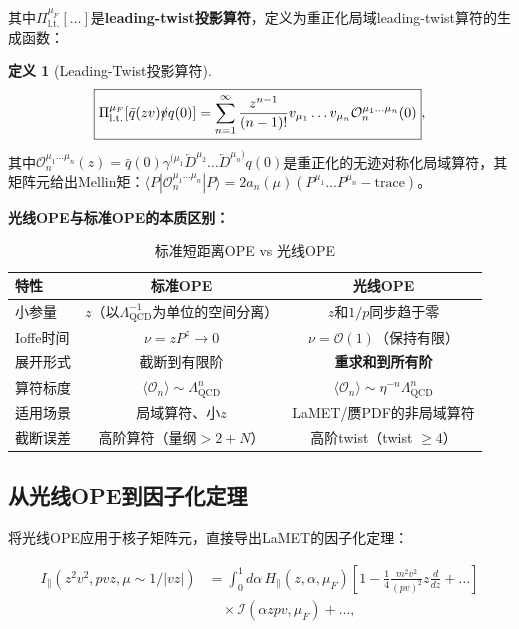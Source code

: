 \documentclass[12pt,a4paper]{ctexart}
\theoremstyle{definition}
\newtheorem{definition}{定义}[section]
\begin{document}
其中$\Pi^{\mu_F}_{\text{l.t.}}[\ldots]$是\textbf{leading-twist投影算符}，定义为重正化局域leading-twist算符的生成函数：

\begin{definition}[Leading-Twist投影算符]\cite{Braun2019power}
\begin{equation}
\boxed{\Pi^{\mu_F}_{\text{l.t.}}[\bar{q}(zv)\slashed{v}q(0)] = \sum_{n=1}^{\infty} \frac{z^{n-1}}{(n-1)!} v_{\mu_1}\ldots v_{\mu_n} \mathcal{O}_n^{\mu_1\ldots\mu_n}(0)},
\label{eq:leading_twist_projection}
\end{equation}
其中$\mathcal{O}_n^{\mu_1\ldots\mu_n}(z) = \bar{q}(0)\gamma^{(\mu_1}\overleftarrow{D}^{\mu_2}\ldots\overleftarrow{D}^{\mu_n)}q(0)$是重正化的无迹对称化局域算符，其矩阵元给出Mellin矩：$\langle P|\mathcal{O}_n^{\mu_1\ldots\mu_n}|P\rangle = 2a_n(\mu)(P^{\mu_1}\ldots P^{\mu_n} - \text{trace})$。
\end{definition}

\textbf{光线OPE与标准OPE的本质区别：}

\begin{table}[H]
\centering
\caption{标准短距离OPE vs 光线OPE}
\label{tab:OPE_comparison}
\begin{tabular}{lcc}
\toprule
特性 & 标准OPE & 光线OPE \\
\midrule
小参量     & $z$（以$\Lambda_{\text{QCD}}^{-1}$为单位的空间分离） & $z$和$1/p$同步趋于零 \\
Ioffe时间  & $\nu = zP^z \to 0$ & $\nu = \mathcal{O}(1)$（保持有限） \\
展开形式  & 截断到有限阶 & \textbf{重求和到所有阶} \\
算符标度  & $\langle\mathcal{O}_n\rangle \sim \Lambda_{\text{QCD}}^n$ & $\langle\mathcal{O}_n\rangle \sim \eta^{-n}\Lambda_{\text{QCD}}^n$ \\
适用场景  & 局域算符、小$z$ & LaMET/赝PDF的非局域算符 \\
截断误差  & 高阶算符（量纲$>2+N$） & 高阶twist（twist $\ge 4$） \\
\bottomrule
\end{tabular}
\end{table}

\subsection{从光线OPE到因子化定理}

将光线OPE应用于核子矩阵元，直接导出LaMET的因子化定理\cite{Braun2019power}：

\begin{equation}
\begin{aligned}
I_\parallel(z^2 v^2, pvz, \mu \sim 1/|vz|) &= \int_0^1 d\alpha\, H_\parallel(z, \alpha, \mu_F) \left[1 - \frac{1}{4}\frac{m^2 v^2}{(pv)^2} z\frac{d}{dz} + \ldots\right] \\
&\quad \times \mathcal{I}(\alpha z pv, \mu_F) + \ldots,
\end{aligned}
\label{eq:factorization_from_OPE}
\end{equation}
\end{document}
